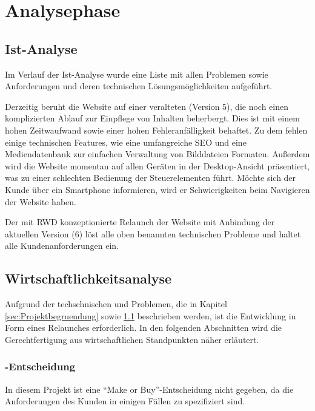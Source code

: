 \section{Analysephase} 
\label{sec:Analysephase}


\subsection{Ist-Analyse} 
\label{sec:IstAnalyse}

Im Verlauf der Ist-Analyse wurde eine Liste mit allen Problemen sowie
Anforderungen und deren technischen Lösungsmöglichkeiten aufgeführt. 

Derzeitig beruht die Website auf einer veralteten \ct (Version 5), die
noch einen komplizierten Ablauf zur Einpflege von Inhalten beherbergt. Dies ist mit
einem hohen Zeitwaufwand sowie einer hohen Fehleranfälligkeit behaftet. Zu dem
fehlen einige technischen Features, wie \zB eine umfangreiche \ac{SEO} und eine
Mediendatenbank zur einfachen Verwaltung von Bilddateien \oae Formaten. 
Außerdem wird die Website momentan auf allen Geräten in der Desktop-Ansicht
präsentiert, was zu einer schlechten Bedienung der Steuerelementen führt.
Möchte sich der Kunde über ein Smartphone informieren, wird er
Schwierigkeiten beim Navigieren der Website haben. 

Der mit \ac{RWD} konzeptionierte Relaunch der Website mit Anbindung der
aktuellen \ct Version (6) löst alle oben benannten technischen Probleme und haltet alle
Kundenanforderungen ein.

\subsection{Wirtschaftlichkeitsanalyse}
\label{sec:Wirtschaftlichkeitsanalyse}
Aufgrund der techschnischen und  Problemen, die in
Kapitel \ref{sec:Projektbegruendung} 
sowie \ref{sec:IstAnalyse}  beschrieben werden,
ist die Entwicklung in Form eines Relaunches erforderlich. In den folgenden Abschnitten wird die Gerechtfertigung aus wirtschaftlichen Standpunkten näher
erläutert.

\subsubsection{-Entscheidung}
\label{sec:MakeOrBuyEntscheidung}
In diesem Projekt ist eine "`Make or Buy"'-Entscheidung nicht gegeben, da die
Anforderungen des Kunden \kunde in einigen Fällen zu spezifiziert sind.

